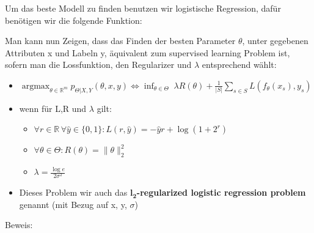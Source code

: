 \documentclass[12pt,a4paper]{article}
\DeclareMathOperator*{\argmax}{argmax}
\newcommand{\nl}{\\[0.1cm]}
\begin{document}
Um das beste Modell zu finden benutzen wir logistische Regression, dafür benötigen wir die folgende Funktion:

\begin{figure}[H]
\end{figure}
Man kann nun Zeigen, dass das Finden der besten Parameter $\theta$, unter gegebenen Attributen x und Labeln y, äquivalent zum supervised learning Problem ist, sofern man die Lossfunktion, den Regularizer und $\lambda$ entsprechend wählt:\nl
\begin{itemize}
\item $\displaystyle\argmax_{\theta\in\mathbb{R}^m} p_{\Theta|X,Y}(\theta, x, y) \Leftrightarrow \displaystyle \inf_{\theta\in\Theta} \; \lambda R(\theta) + \frac{1}{|S|} \sum_{s\in S} L(f_\theta (x_s), y_s)$
\item wenn für L,R und $\lambda$ gilt:
\begin{itemize}
\item $\forall r\in \mathbb{R}\, \forall \hat{y}\in \{0,1\}: L(r, \hat{y}) = -\hat{y}r+\log(1+2^r)$
\item $\forall \theta\in \Theta: R(\theta) = \|\theta\|^2_2$
\item $\lambda = \frac{\log e}{2\sigma^2}$
\end{itemize}
\item Dieses Problem wir auch das \textbf{$\mathbf{l_2}$-regularized logistic regression problem} genannt (mit Bezug auf x, y, $\sigma$)
\end{itemize}
Beweis:
\end{document}
